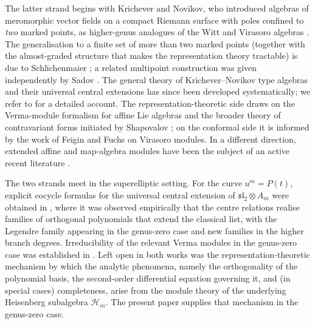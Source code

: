 \documentclass[12pt]{amsart}
\theoremstyle{plain}
\theoremstyle{definition}
\newcommand{\Hm}{{\mathcal{H}_m}}     %
\begin{document}
The latter strand begins with Krichever and Novikov, who introduced
algebras of meromorphic vector fields on a compact Riemann surface
with poles confined to \emph{two} marked points, as higher-genus
analogues of the Witt and Virasoro algebras
\cite{KricheverNovikov1987}. The generalisation to a finite set of
more than two marked points (together with the almost-graded
structure that makes the representation theory tractable) is due to
Schlichenmaier \cite{Schlichenmaier1990a,Schlichenmaier1990b}; a
related multipoint construction was given independently by Sadov
\cite{Sadov1991}. The general theory of Krichever--Novikov type
algebras and their universal central extensions has since been
developed systematically; we refer to
\cite{Schlichenmaier2014,SchlichenmaierSurvey} for a detailed
account. The representation-theoretic side draws on the
Verma-module formalism for affine Lie algebras
\cite{KacRaina,KacWakimoto1988} and the broader theory of
contravariant forms initiated by Shapovalov \cite{Shapovalov1972}; on
the conformal side it is informed by the work of Feigin and Fuchs
\cite{FeiginFuchs1990} on Virasoro modules. In a different direction,
extended affine and map-algebra modules have been the subject of an
active recent literature
\cite{BilligLau2011,CoxGuoLuZhao2016_Torus,CoxIm2018}.

The two strands meet in the superelliptic setting. For the curve
$u^m = P(t)$, explicit cocycle formulas for the universal central
extension of $\mathfrak{sl}_2 \otimes A_m$ were obtained in
\cite{SantosNeklyudovFutorny2025}, where it was observed empirically
that the centre relations realise families of orthogonal polynomials
that extend the classical list, with the Legendre family appearing
in the genus-zero case and new families in the higher branch
degrees. Irreducibility of the relevant Verma modules in
the genus-zero case was established in \cite{PhiVerma}. Left open
in both works was the representation-theoretic mechanism by which
the analytic phenomena, namely the orthogonality of the polynomial basis,
the second-order differential equation governing it, and (in special
cases) completeness, arise from the module theory of the
underlying Heisenberg subalgebra $\Hm$. The present paper supplies
that mechanism in the genus-zero case.
\end{document}
